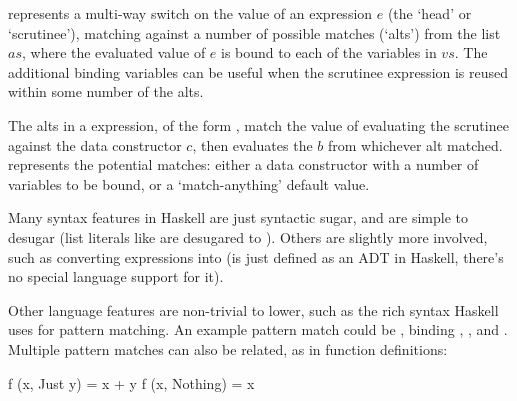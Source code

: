\documentclass[dissertation.tex]{subfiles}
\begin{document}
{{{            
            
             represents a multi-way switch on the value of an expression \(e\) (the
            `head' or `scrutinee'), matching against a number of possible matches (`alts') from the list \(as\), where
            the evaluated value of \(e\) is bound to each of the variables in \(vs\). The additional binding variables
            can be useful when the scrutinee expression is reused within some number of the alts.

            
            The alts in a  expression, of the form , match the value of
            evaluating the scrutinee against the data constructor \(c\), then evaluates the \(b\) from whichever alt
            matched.  represents the potential matches: either a data constructor with a
            number of variables to be bound, or a `match-anything' default value.


            Many syntax features in Haskell are just syntactic sugar, and are simple to desugar (list literals like
            \haskell{[1, 2]} are desugared to ). Others are slightly more involved, such as converting
             expressions into 
            (is just defined as an ADT in Haskell, there's no special language support for it).

            Other language features are non-trivial to lower, such as the rich syntax Haskell uses for pattern matching.
            An example pattern match could be , binding ,
            , and . Multiple pattern matches can also be related, as in function
            definitions:

            \begin{haskellfigure}
            f (x, Just y) = x + y
            f (x, Nothing) = x
            \end{haskellfigure}

}}}
\end{document}
